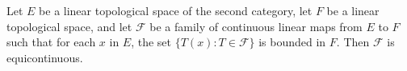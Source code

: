 Let $E$ be a linear topological space of the second category, let $F$ be a linear topological space, and let $\mathcal{F}$ be a family of continuous linear maps from $E$ to $F$ such that for each $x$ in $E$, the set $\{T(x) : T \in \mathcal{F}\}$ is bounded in $F$. Then $\mathcal{F}$ is equicontinuous.
